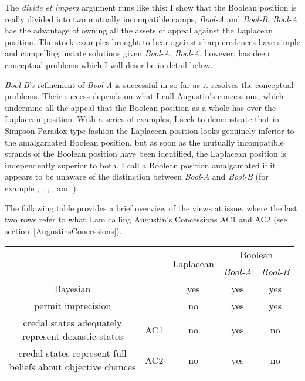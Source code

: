 \documentclass[11pt]{article}
\newcommand{\anderson}[0]{\textit{Bool-A}}
\newcommand{\augustin}[0]{\textit{Bool-B}}
\begin{document}
The \emph{divide et impera} argument runs like this: I show that the
Boolean position is really divided into two mutually incompatible
camps, {\anderson} and {\augustin}. {\anderson} has the advantage of
owning all the assets of appeal against the Laplacean position. The
stock examples brought to bear against sharp credences have simple and
compelling instate solutions given {\anderson}. {\anderson}, however,
has deep conceptual problems which I will describe in detail below.

{\augustin}'s refinement of {\anderson} is successful in so far as it
resolves the conceptual problems. Their success depends on what I call
Augustin's concessions, which undermine all the appeal that the
Boolean position as a whole has over the Laplacean position. With a
series of examples, I seek to demonstrate that in Simpson Paradox type
fashion the Laplacean position looks genuinely inferior to the
amalgamated Boolean position, but as soon as the mutually incompatible
strands of the Boolean position have been identified, the Laplacean
position is independently superior to both. I call a Boolean position
amalgamated if it appears to be unaware of the distinction between
{\anderson} and {\augustin} (for example ;
; ;
; and ).

The following table provides a brief overview of the views at issue,
where the last two rows refer to what I am calling Augustin's
Concessions AC1 and AC2 (see section~\ref{AugustinsConcessions}).

\begin{tabular}{|c|c|c|c|c|}\hline
                     & & \multirow{2}{*}{Laplacean} & \multicolumn{2}{c|}{Boolean} \\ \cline{4-5}
                     & & & {\anderson} & {\augustin} \\ \hline
  Bayesian           & & yes       & yes         & yes         \\ \hline
  permit imprecision & & no        & yes         & yes         \\ \hline
  \makecell{credal states adequately \\ represent doxastic states} & AC1 & no & yes & no \\ \hline
  \makecell{credal states represent full \\ beliefs about objective chances} & AC2 & no & yes & no \\ \hline
\end{tabular}
\end{document}
